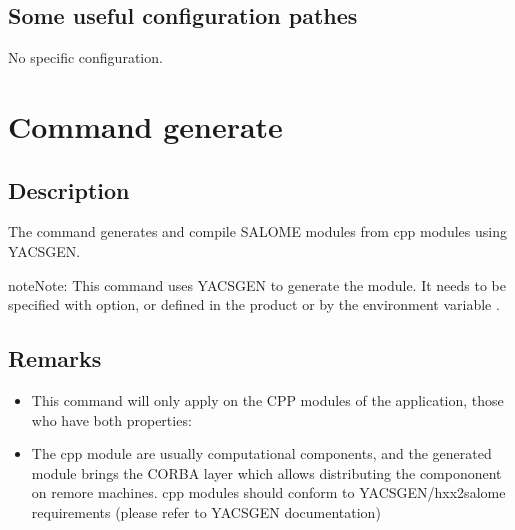 \documentclass[a4paper,10pt,english]{sphinxmanual}
\begin{document}
\begin{itemize}
\end{itemize}


\subsection{Some useful configuration pathes}
\label{\detokenize{commands/package:some-useful-configuration-pathes}}
No specific configuration.

\clearpage


\section{Command generate}
\label{\detokenize{commands/generate:svn}}\label{\detokenize{commands/generate:command-generate}}\label{\detokenize{commands/generate::doc}}

\subsection{Description}
\label{\detokenize{commands/generate:description}}
The  command generates and compile SALOME modules from cpp modules using YACSGEN.

\begin{sphinxadmonition}{note}{Note:}
This command uses YACSGEN to generate the module. It needs to be specified with  option, or defined in the product or by the environment variable .
\end{sphinxadmonition}


\subsection{Remarks}
\label{\detokenize{commands/generate:remarks}}\begin{itemize}
\item {} 
This command will only apply on the CPP modules of the application, those who have both properties:

%
\begin{sphinxVerbatim}[commandchars=\\\{\}]
  
  
\end{sphinxVerbatim}

\item {} 
The cpp module are usually computational components, and the generated module brings the CORBA layer which allows distributing the compononent on remore machines. cpp modules should conform to YACSGEN/hxx2salome requirements (please refer to YACSGEN documentation)

\end{itemize}
\end{document}
